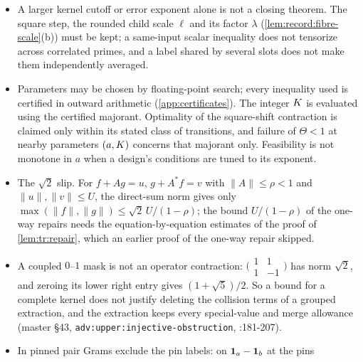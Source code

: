 \begin{itemize}
 function under a fixed positive measure) that was priced at
 exponent $a_0$, and let $W\ge0$ be a lower moment of the same
 function under the same measure, not yet priced (\emph{unpriced}).
 Replacing $U$ by $W$ after repricing improves the bound only if
 $W>U/C$, where $C=e^{t_0L}$ with $t_0$ the repricing increment
 $2(a-a_0)$ and $L=570$ the block budget; and $U,W$ must be
 moments for one common positive measure. Local losses
 recur at every induction step and are charged at every step, as $R_I$ is.
\item A larger kernel cutoff or error exponent alone is not a closing theorem.
 The square step, the rounded child scale $\ell$ and its factor $\lambda$ (\cref{lem:record:fibre-scale}(b)) must be kept; a
 same-input scalar inequality does not tensorize across correlated primes, and a
 label shared by several slots does not make them independently averaged.
\item Parameters may be chosen by floating-point search; every inequality used is certified in outward arithmetic
 (\cref{app:certificates}). The integer $K$ is evaluated using the certified
 majorant. Optimality of the square-shift contraction is claimed only within
 its stated class of transitions, and failure of $\Theta<1$ at nearby parameters
 $(a,K)$ concerns that majorant only. Feasibility is not
 monotone in $a$ when a design's conditions are tuned to its exponent.
\item The $\sqrt2$ slip. For $f+Ag=u$, $g+A^*f=v$ with $\|A\|\le\rho<1$ and
 $\|u\|,\|v\|\le U$, the direct-sum norm gives only
 $\max(\|f\|,\|g\|)\le\sqrt2\,U/(1-\rho)$; the bound $U/(1-\rho)$ of the one-way
 repairs needs the equation-by-equation estimates of the proof of
 \cref{lem:tr:repair}, which an earlier proof of the one-way repair skipped.
\item A coupled $0$--$1$ mask is not an operator contraction:
 $\bigl(\begin{smallmatrix}1&1\\1&-1\end{smallmatrix}\bigr)$ has norm $\sqrt2$, and
 zeroing its lower right entry gives $(1+\sqrt5)/2$. So a bound for a complete
 kernel does not justify deleting the collision terms of a grouped extraction,
 and the extraction keeps every special-value and merge allowance (master \S43,
 \texttt{adv:upper:injective-obstruction},
 :181-207).
\item In pinned pair Grams exclude the pin labels: on $\mathbf 1_a-\mathbf 1_b$ at the pins

\end{itemize}
